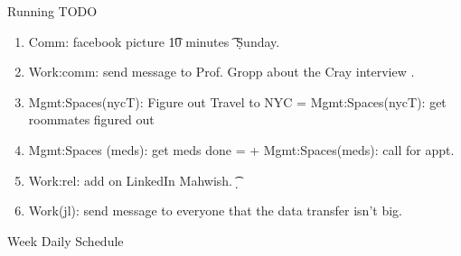 \begin{frame}
\begin{columns}
\begin{column}{0.50\linewidth}
\begin{block}{Running TODO}
\begin{enumerate}
        \item \tiny Comm: facebook picture \t{10 minutes} \t{}
          \d{Sunday}. 


        \item \tiny Work:comm: send message to Prof. Gropp about the
          Cray interview . 

        \item \tiny Mgmt:Spaces(nycT): Figure out Travel to NYC =
          Mgmt:Spaces(nycT): get roommates figured out 
        \small \item \small Mgmt:Spaces (meds): get meds done = 
         +
        Mgmt:Spaces(meds): call for appt.
        
      \item \tiny Work:rel: add on LinkedIn Mahwish. \t{} \d{} \p{}   

      \item \tiny Work(jl): send message to everyone that the data
        transfer isn't big. 
        
        \end{enumerate}

      \end{block} 

      \begin{block}{Week Daily Schedule} 


\end{block}
\end{column}
\end{columns}
\end{frame}
